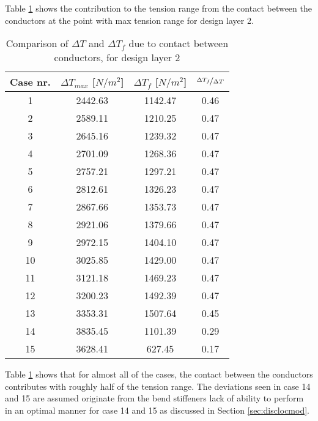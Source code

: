 Table \ref{table:tensfri} shows the contribution to the tension range from the contact between the conductors at the point with max tension range for design layer 2. 
\begin{table} [H]
\centering
\begin{tabular}{ |c|c|c|c|}
\hline
	Case nr.  & $\Delta T_{max}$ [$N/m^2$] & $\Delta T_f$ [$N/m^2$] & $\nicefrac{\Delta T_f}{\Delta T}$ \\ 
 \hline
 \hline
	1 & 2442.63 & 1142.47 & 0.46  \\ 
	2 & 2589.11 & 1210.25 & 0.47   \\ 
	3 & 2645.16 & 1239.32 & 0.47   \\ 
	4 & 2701.09 & 1268.36 & 0.47   \\
	5 & 2757.21 & 1297.21 & 0.47   \\ 
	6 & 2812.61 & 1326.23 & 0.47  \\ 
	7 & 2867.66 & 1353.73 & 0.47   \\ 
	8 & 2921.06 & 1379.66 & 0.47  \\ 
	9 & 2972.15 & 1404.10 & 0.47  \\ 
	10 & 3025.85 & 1429.00 & 0.47   \\ 
	11 & 3121.18 & 1469.23 & 0.47   \\ 
	12 & 3200.23 & 1492.39 & 0.47  \\ 
	13 & 3353.31 & 1507.64 & 0.45   \\ 
	14 & 3835.45 & 1101.39 & 0.29   \\ 
	15 & 3628.41 & 627.45 & 0.17   \\ 
\hline
\end{tabular}
\caption{Comparison of $\Delta T$ and $\Delta T_f$ due to contact between conductors, for design layer 2}
\label{table:tensfri}
\end{table}
Table \ref{table:tensfri} shows that for almost all of the cases, the contact between the conductors contributes with roughly half of the tension range. The deviations seen in case 14 and 15 are assumed originate from the bend stiffeners lack of ability to perform in an optimal manner for case 14 and 15 as discussed in Section \ref{sec:disclocmod}. 


